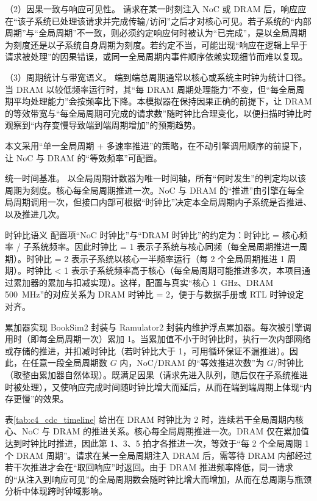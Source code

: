 （2）因果一致与响应可见性。 请求在某一时刻注入 NoC 或 DRAM 后，响应应在“该子系统已处理该请求并完成传输/访问”之后才对核心可见。若子系统的“内部周期”与“全局周期”不一致，则必须约定响应何时被认为“已完成”，是以全局周期为刻度还是以子系统自身周期为刻度。若约定不当，可能出现“响应在逻辑上早于请求被处理”的因果错误，或同一全局周期内事件顺序依赖实现细节而难以复现。

（3）周期统计与带宽语义。 端到端总周期通常以核心或系统主时钟为统计口径。当 DRAM 以较低频率运行时，其“每 DRAM 周期处理能力”不变，但“每全局周期平均处理能力”会按频率比下降。本模拟器在保持因果正确的前提下，让 DRAM 的等效带宽与“每全局周期可完成的请求数”随时钟比合理变化，以便扫描时钟比时观察到“内存变慢导致端到端周期增加”的预期趋势。


本文采用“单一全局周期 + 多速率推进”的策略，在不动引擎调用顺序的前提下，让 NoC 与 DRAM 的“等效频率”可配置。

统一时间基准。 以全局周期计数器为唯一时间轴，所有“何时发生”的判定均以该周期为刻度。核心每全局周期推进一次。NoC 与 DRAM 的“推进”由引擎在每全局周期调用一次，但接口内部可根据“时钟比”决定本全局周期内子系统是否推进、以及推进几次。

时钟比语义  配置项“NoC 时钟比”与“DRAM 时钟比”的约定为：时钟比 = 核心频率 / 子系统频率。因此时钟比 = 1 表示子系统与核心同频（每全局周期推进一周期）。时钟比 = 2 表示子系统以核心一半频率运行（每 2 个全局周期推进 1 周期）。时钟比 < 1 表示子系统频率高于核心（每全局周期可能推进多次，本项目通过累加器的累加与扣减实现）。这样，配置与真实“核心 \SI{1}{GHz}、DRAM \SI{500}{MHz}”的对应关系为 DRAM 时钟比 = 2，便于与数据手册或 RTL 时钟设定对齐。

累加器实现  BookSim2 封装与 Ramulator2 封装内维护浮点累加器。每次被引擎调用时（即每全局周期一次）累加 1。当累加值不小于时钟比时，执行一次内部网络或存储的推进，并扣减时钟比（若时钟比大于 1，可用循环保证不漏推进）。因此，在任意一段全局周期数 $G$ 内，NoC/DRAM 的“等效推进次数”为 $G/\text{时钟比}$（取整由累加器自然体现）。既满足因果（请求先进入队列，随后仅在子系统推进时被处理），又使响应完成时间随时钟比增大而延后，从而在端到端周期上体现“内存更慢”的效果。


表\ref{tab:c4_cdc_timeline} 给出在 DRAM 时钟比为 2 时，连续若干全局周期内核心、NoC 与 DRAM 的推进关系。核心每全局周期推进一次。DRAM 仅在累加值达到时钟比时推进，因此第 1、3、5 拍才各推进一次，等效于“每 2 个全局周期 1 个 DRAM 周期”。请求在某一全局周期注入 DRAM 后，需等待 DRAM 内部经过若干次推进才会在“取回响应”时返回。由于 DRAM 推进频率降低，同一请求的“从注入到响应可见”的全局周期数会随时钟比增大而增加，从而在总周期与瓶颈分析中体现跨时钟域影响。

